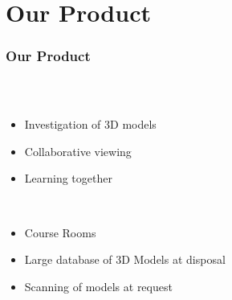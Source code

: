 \section{Our Product}

\begin{frame}
  \frametitle{Our Product}
   \begin{columns}
    \begin{column}{0.8\textwidth}
      \begin{description}[]
        \item[What is it?] \hfill \\
        \begin{itemize}
          \item Investigation of  3D models
          \item Collaborative viewing
          \item Learning together
        \end{itemize}

        \bigskip
        \item[Key features ] \hfill \\
          \begin{itemize}
            \item Course Rooms
            \item Large database of 3D Models at disposal
            \item Scanning of models at request
        \end{itemize}
      \end{description}
    \end{column}


\end{columns}
\end{frame}
